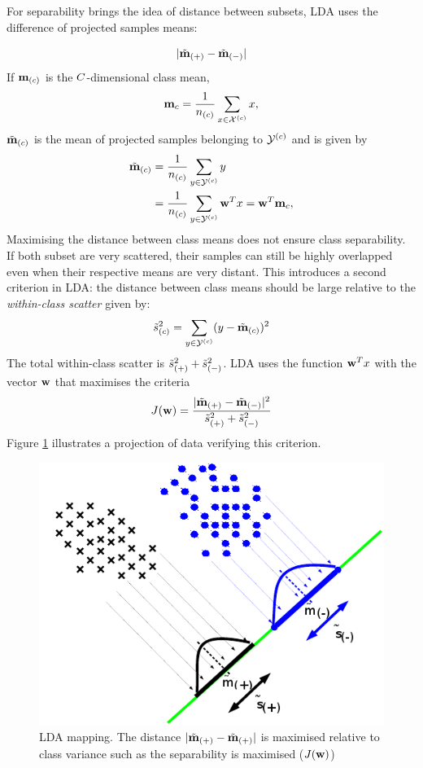 For separability brings the idea of distance between subsets,
LDA uses the difference of projected samples means:

\[ |\tilde{\mathbf{m}}_{(+)} - \tilde{\mathbf{m}}_{(-)} | \] 
If $\mathbf{m}_{(c)}$ is the $C$-dimensional class mean,
\begin{equation}
\label{eq:lda-class-orig-mean}
\m_c = \frac{1}{n_{(c)}} \sum_{\x \in \Xc^{(c)}} \x,
\end{equation}
$\tilde{\mathbf{m}}_{(c)}$ is the mean of projected samples belonging to $\mathcal{Y}^{(c)}$ and is given by  
\begin{equation}
\label{eq:lda-class-proj-mean}
  \begin{split}
    \tilde{\m}_{(c)} & = \frac{1}{n_{(c)}} \sum_{y \in \Yc^{(c)}} y
		\\
    & = \frac{1}{n_{(c)}} \sum_{y \in \Yc^{(c)}} \w^T \x = \w^T \m_c ,
  \end{split}  
\end{equation}
Maximising the distance between class means does not ensure class separability. 
If both subset are very scattered, their samples can still be highly overlapped even when their respective means are very distant.
This introduces a second criterion in LDA: the distance between class means should be large relative to the \emph{within-class scatter} given by:
\begin{equation}
\label{eq:lda-within-class-scatter}
\scat_{(c)} = \sum_{y \in \Yc^{(c)}} (y-\tilde{\m}_{(c)})^2  
\end{equation} 
The total within-class scatter is $\tilde{s}^2_{(+)}+\tilde{s}^2_{(-)}$.
LDA uses the function $\mathbf{w}^T x$ with the vector $\mathbf{w}$ that maximises the criteria 
\begin{equation}
\label{eq:lda-criteria}
J(\w) = \frac{|\tilde{\m}_{(+)} - \tilde{\m}_{(-)} |^2}{\scat_{(+)}+\scat_{(-)}}
\end{equation}
Figure \ref{fig:lda} illustrates a projection of data verifying this criterion. 
\begin{figure}[!ht]
    \centering
    \includegraphics[width=0.5\columnwidth]{Figures/lda}
    \caption{\footnotesize{LDA mapping. The distance $|\tilde{\mathbf{m}}_{(+)}-\tilde{\mathbf{m}}_{(+)}|$} is maximised relative to class variance such as the separability is maximised ($J(\mathbf{w})$) }
    \label{fig:lda}
\end{figure}
